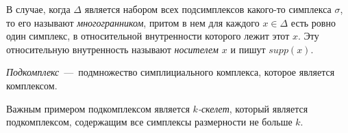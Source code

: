 	В случае, когда $\Delta$ является набором всех подсимплексов какого-то симплекса $\sigma$, то его называют \emph{многогранником}, притом в нем для каждого $x \in \Delta$ есть ровно один симплекс, в относительной внутренности которого лежит этот $x$. Эту относительную внутренность называют \emph{носителем $x$} и пишут $supp(x)$.
	
\begin{definition}
	\emph{Подкомплекс}~---~подмножество симплициального комплекса, которое является комплексом.
\end{definition}

	Важным примером подкомплексом является \emph{$k$-скелет}, который является подкомплексом, содержащим все симплексы размерности не больше $k$.